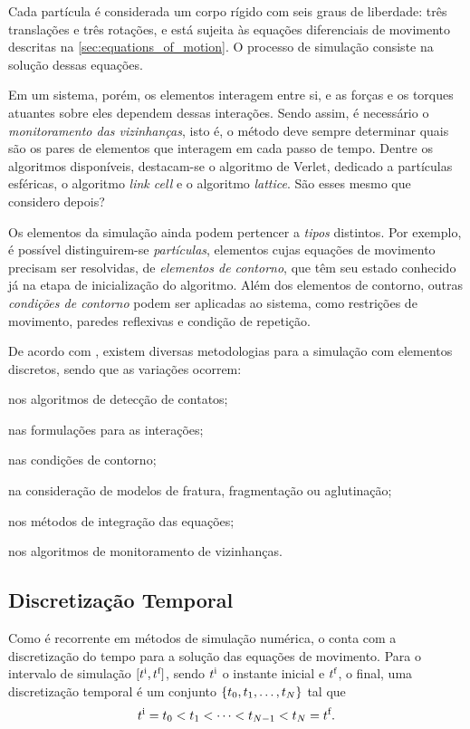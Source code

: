 Cada partícula é considerada um corpo rígido com seis graus de liberdade: três translações e três rotações, e está sujeita às equações diferenciais de movimento descritas na \autoref{sec:equations_of_motion}. O processo de simulação consiste na solução dessas equações. 

Em um sistema, porém, os elementos interagem entre si, e as forças e os torques atuantes sobre eles dependem dessas interações. Sendo assim, é necessário o \textit{monitoramento das vizinhanças}, isto é, o método deve sempre determinar quais são os pares de elementos que interagem em cada passo de tempo. Dentre os algoritmos disponíveis, destacam-se o algoritmo de Verlet, dedicado a partículas esféricas, o algoritmo \textit{link cell} e o algoritmo \textit{lattice}. \alert{São esses mesmo que considero depois?}

Os elementos da simulação ainda podem pertencer a \textit{tipos} distintos. Por exemplo, é possível distinguirem-se \textit{partículas}, elementos cujas equações de movimento precisam ser resolvidas, de \textit{elementos de contorno}, que têm seu estado conhecido já na etapa de inicialização do algoritmo. Além dos elementos de contorno, outras \textit{condições de contorno} podem ser aplicadas ao sistema, como restrições de movimento, paredes reflexivas e condição de repetição.

De acordo com , existem diversas metodologias para a simulação com elementos discretos, sendo que as variações ocorrem:
\begin{alineas}
	\item nos algoritmos de detecção de contatos;
	\item nas formulações para as interações;
	\item nas condições de contorno;
	\item na consideração de modelos de fratura, fragmentação ou aglutinação;
	\item nos métodos de integração das equações;
	\item nos algoritmos de monitoramento de vizinhanças.
\end{alineas}

\subsection{Discretização Temporal}

Como é recorrente em métodos de simulação numérica, o \DEM{} conta com a discretização do tempo para a solução das equações de movimento. Para o intervalo de simulação \(\interval{\initialInstant}{\finalInstant}\), sendo \(\initialInstant\) o instante inicial e \(\finalInstant\), o final, uma discretização temporal é um conjunto \(\set{t_0, t_1, \dotsc, t_{\numberOfTimesteps}}\) tal que
\begin{equation*}
	\initialInstant = \instant[0] < \instant[1] < \dotsb < \instant[\numberOfTimesteps - 1] < \instant[\numberOfTimesteps] = \finalInstant.
\end{equation*}

